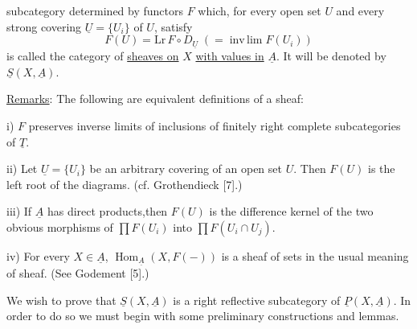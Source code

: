 subcategory determined by functors $F$ which, for every open set $U$ and every strong covering $\underline U=\{U_i\}$ of $U$, satisfy
\[
F(U)=\mathrm{Lr}\,F\circ D_{\underline U}\;(=\operatorname{inv\,lim}F(U_i))
\]
is called the category of \uline{sheaves on} $X$ \uline{with values in} $\underline A$. It will be denoted by $\underline S(X,\underline A)$.

\uline{Remarks}: The following are equivalent definitions of a sheaf:

i) $F$ preserves inverse limits of inclusions of finitely right complete subcategories of $\underline T$.

ii) Let $\underline U=\{U_i\}$ be an arbitrary covering of an open set $U$. Then $F(U)$ is the left root of the diagrams.
(cf. Grothendieck [7].)

iii) If $\underline A$ has direct products,then $F(U)$ is the difference kernel of the two obvious morphisms of $\prod F(U_i)$ into $\prod F(U_i\cap U_j)$.

iv) For every $X\in\underline A$, $\operatorname{Hom}_{\underline A}(X,F(-))$ is a sheaf of sets in the usual meaning of sheaf. (See Godement [5].)

We wish to prove that $\underline S(X,\underline A)$ is a right reflective subcategory of $\underline P(X,\underline A)$. In order to do so we must begin with some preliminary constructions and lemmas.
